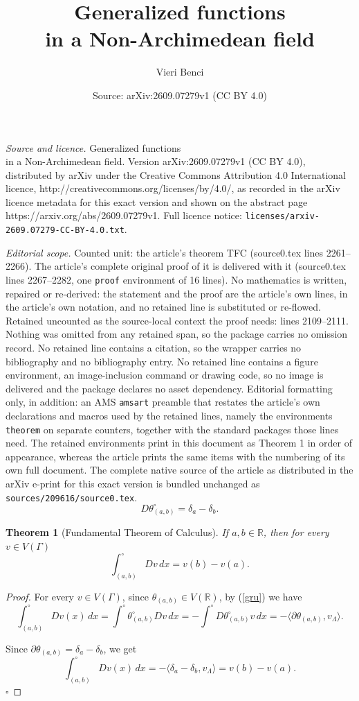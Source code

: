 \documentclass[10pt,a4paper]{amsart}
\title{Generalized functions\\ in a Non-Archimedean field}
\author{Vieri Benci}
\date{Source: arXiv:2609.07279v1 (CC BY 4.0)}
\newtheorem{theorem}{Theorem}
\begin{document}
\maketitle

\noindent\emph{Source and licence.} Generalized functions\\ in a Non-Archimedean field. Version arXiv:2609.07279v1 (CC BY 4.0), distributed by arXiv under the Creative Commons Attribution 4.0 International licence, http://creativecommons.org/licenses/by/4.0/, as recorded in the arXiv licence metadata for this exact version and shown on the abstract page https://arxiv.org/abs/2609.07279v1. Full licence notice: \texttt{licenses/arxiv-2609.07279-CC-BY-4.0.txt}.\par\smallskip

\noindent\textit{Editorial scope.} Counted unit: the article's theorem TFC (source0.tex lines 2261--2266). The article's complete original proof of it is delivered with it (source0.tex lines 2267--2282, one \texttt{proof} environment of 16 lines). No mathematics is written, repaired or re-derived: the statement and the proof are the article's own lines, in the article's own notation, and no retained line is substituted or re-flowed.  Retained uncounted as the source-local context the proof needs: lines 2109--2111.  Nothing was omitted from any retained span, so the package carries no omission record.  No retained line contains a citation, so the wrapper carries no bibliography and no bibliography entry.  No retained line contains a figure environment, an image-inclusion command or drawing code, so no image is delivered and the package declares no asset dependency.  Editorial formatting only, in addition: an AMS \texttt{amsart} preamble that restates the article's own declarations and macros used by the retained lines, namely the environments \texttt{theorem} on separate counters, together with the standard packages those lines need.  The retained environments print in this document as Theorem 1 in order of appearance, whereas the article prints the same items with the numbering of its own full document.  The complete native source of the article as distributed in the arXiv e-print for this exact version is bundled unchanged as \texttt{sources/209616/source0.tex}.
\begin{equation}
D\theta^{\circ}_{(a,b)}=\delta_{a}-\delta_{b}.\label{gru}
\end{equation}

\begin{theorem}[Fundamental Theorem of Calculus]\label{TFC} If $a,b\in\mathbb{R}$,
then for every $v\in V(\Gamma)$ 
\[
\int^{\circ}_{(a,b)}Dv\,dx=v(b)-v(a).
\]
\end{theorem}

\begin{proof}
For every $v\in V(\Gamma)$, since $\theta_{(a,b)}\in V(\mathbb{R})$,
by (\ref{gru}) we have 
\[
\int^{\circ}_{(a,b)}Dv(x)\,dx=\int^{\circ}\theta^{\circ}_{(a,b)}Dv\,dx=-\int^{\circ}D\theta^{\circ}_{(a,b)}v\,dx=-\langle\partial\theta_{(a,b)},v_{\Lambda}\rangle.
\]

Since $\partial\theta_{(a,b)}=\delta_a-\delta_b$, we get
\[
\int_{(a,b)}^{\circ} Dv(x)\,dx
=-\langle \delta_a-\delta_b, v_\Lambda\rangle
=
v(b)-v(a).
\]
$\square$
\end{proof}
\end{document}
